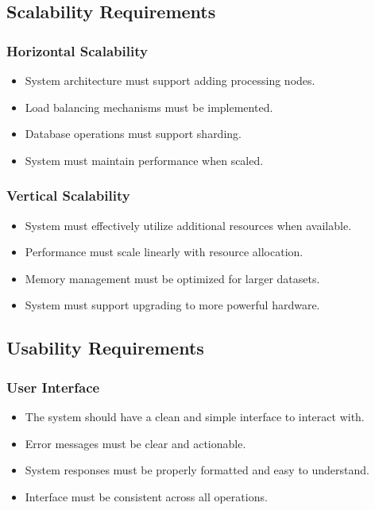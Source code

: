 \documentclass[12pt,a4paper]{report}
\begin{document}
\subsection{Scalability Requirements}

\subsubsection{Horizontal Scalability}
\begin{itemize}
    \item System architecture must support adding processing nodes.
    \item Load balancing mechanisms must be implemented.
    \item Database operations must support sharding.
    \item System must maintain performance when scaled.
\end{itemize}

\subsubsection{Vertical Scalability}
\begin{itemize}
    \item System must effectively utilize additional resources when available.
    \item Performance must scale linearly with resource allocation.
    \item Memory management must be optimized for larger datasets.
    \item System must support upgrading to more powerful hardware.
\end{itemize}

\subsection{Usability Requirements}

\subsubsection{User Interface}
\begin{itemize}
    \item The system should have a clean and simple interface to interact with.
    \item Error messages must be clear and actionable.
    \item System responses must be properly formatted and easy to understand.
    \item Interface must be consistent across all operations.
\end{itemize}
\end{document}

